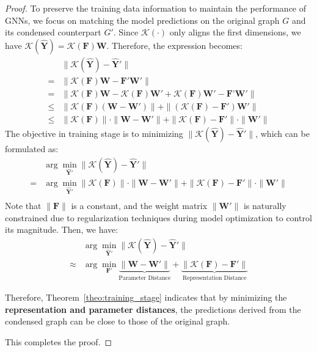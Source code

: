 \begin{proof}
To preserve the training data information to maintain the performance of GNNs, we focus on matching the model predictions on the original graph $G$ and its condensed counterpart $G'$. Since $\mathcal{K}(\cdot)$ only aligns the first dimensions, we have $\mathcal{K}(\hat{\mathbf{Y}}) = \mathcal{K}(\mathbf{F})\mathbf{W}$. Therefore, the expression becomes:
\begin{equation}
    \begin{aligned}
    &\| \mathcal{K}(\hat{\mathbf{Y}}) - \hat{\mathbf{Y}}' \| \\
    = &\| \mathcal{K}(\mathbf{F})\mathbf{W} - \mathbf{F}'\mathbf{W}' \| \\
    = & \| \mathcal{K}(\mathbf{F}) \mathbf{W} - \mathcal{K}(\mathbf{F}) \mathbf{W}' + \mathcal{K}(\mathbf{F}) \mathbf{W}' - \mathbf{F}’ \mathbf{W}' \| \\
    \leq &\| \mathcal{K}(\mathbf{F}) (\mathbf{W} - \mathbf{W}') \| + \| (\mathcal{K}(\mathbf{F}) -  \mathbf{F}')\mathbf{W}' \| \\
    \leq & \| \mathcal{K}(\mathbf{F}) \| \cdot \| \mathbf{W} - \mathbf{W}' \| + \| \mathcal{K}(\mathbf{F}) - \mathbf{F}' \| \cdot \| \mathbf{W}' \|
\end{aligned}
\end{equation}
The objective in training stage is to minimizing $\| \mathcal{K}(\hat{\mathbf{Y}}) - \hat{\mathbf{Y}}' \|$, which can be formulated as:
\begin{equation}
    \begin{aligned}
    &\arg \min_{\hat{\mathbf{Y}}'} \| \mathcal{K}(\hat{\mathbf{Y}}) - \hat{\mathbf{Y}}' \|\\
    =&\arg \min_{\hat{\mathbf{Y}}'} \| \mathcal{K}(\mathbf{F}) \| \cdot \| \mathbf{W} - \mathbf{W}' \| + \| \mathcal{K}(\mathbf{F}) - \mathbf{F}' \| \cdot \| \mathbf{W}' \|\\
    \end{aligned}
\end{equation}
Note that $\|\mathbf{F}\|$ is a constant, and the weight matrix $\| \mathbf{W}' \|$ is naturally constrained due to regularization techniques during model optimization to control its magnitude. Then, we have:
\begin{equation}
    \begin{aligned}
    &\arg \min_{\hat{\mathbf{Y}}'} \| \mathcal{K}(\hat{\mathbf{Y}}) - \hat{\mathbf{Y}}' \|\\
    \approx&\arg \min_{\mathbf{F}'}  \underbrace{\| \mathbf{W} - \mathbf{W}' \|}_{\text{Parameter Distance}} + \underbrace{\| \mathcal{K}(\mathbf{F}) - \mathbf{F}' \|}_{\text{Representation Distance}}
    \end{aligned}
\end{equation}




Therefore, Theorem~\ref{theo:training_stage} indicates that by minimizing the \textbf{representation and parameter distances}, the predictions derived from the condensed graph can be close to those of the original graph.

This completes the proof. 
\end{proof}


